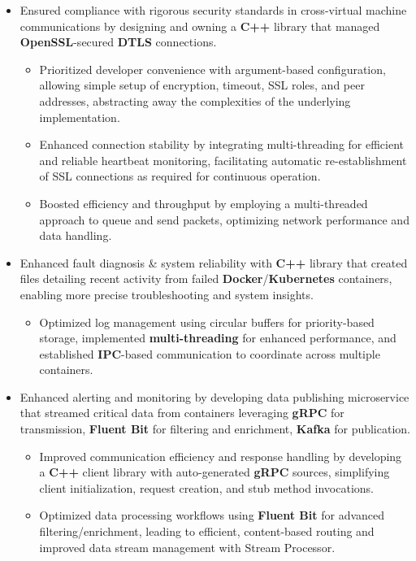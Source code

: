 \documentclass[a4paper]{article}
\begin{document}
\begin{itemize}
	\item Ensured compliance with rigorous security standards in cross-virtual machine communications by designing and owning a \textbf{C++} library that managed \textbf{OpenSSL}-secured \textbf{DTLS} connections.
        \begin{itemize}
	        \item Prioritized developer convenience with argument-based configuration, allowing simple setup of encryption, timeout, SSL roles, and peer addresses, abstracting away the complexities of the underlying implementation.
	        \item Enhanced connection stability by integrating multi-threading for efficient and reliable heartbeat monitoring, facilitating automatic re-establishment of SSL connections as required for continuous operation.
	        \item Boosted efficiency and throughput by employing a multi-threaded approach to queue and send packets, optimizing network performance and data handling.
        \end{itemize}
	\item Enhanced fault diagnosis \& system reliability with \textbf{C++} library that created files detailing recent activity from failed \textbf{Docker}/\textbf{Kubernetes} containers, enabling more precise troubleshooting and system insights.
        \begin{itemize}
	        \item Optimized log management using circular buffers for priority-based storage, implemented \textbf{multi-threading} for enhanced performance, and established \textbf{IPC}-based communication to coordinate across multiple containers.
        \end{itemize}
	\item Enhanced alerting and monitoring by developing data publishing microservice that streamed critical data from containers leveraging \textbf{gRPC} for transmission, \textbf{Fluent Bit} for filtering and enrichment, \textbf{Kafka} for publication.
        \begin{itemize}
	        \item Improved communication efficiency and response handling by developing a \textbf{C++} client library with auto-generated \textbf{gRPC} sources, simplifying client initialization, request creation, and stub method invocations.
	        \item Optimized data processing workflows using \textbf{Fluent Bit} for advanced filtering/enrichment, leading to efficient, content-based routing and improved data stream management with Stream Processor.

\end{itemize}
\end{itemize}
\end{document}
